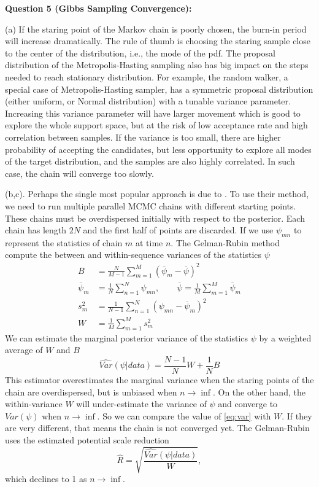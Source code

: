 \documentclass[12pt]{article}
\begin{document}
\newpage
\textbf{Question 5 (Gibbs Sampling Convergence):}

(a) If the staring point of the Markov chain is poorly chosen, the burn-in
period will increase dramatically. The rule of thumb is choosing the staring
sample close to the center of the distribution, i.e., the mode of the pdf. The
proposal distribution of the Metropolis-Hasting sampling also has big impact on
the steps needed to reach stationary distribution. For example, the random
walker, a special case of Metropolis-Hasting sampler, has a symmetric proposal
distribution (either uniform, or Normal distribution) with a tunable variance
parameter. Increasing this variance parameter will have larger movement which is
good to explore the whole support space, but at the risk of low acceptance rate
and high correlation between samples. If the variance is too small, there are
higher probability of accepting the candidates, but less opportunity to explore
all modes of the target distribution, and the samples are also highly
correlated. In such case, the chain will converge too slowly.

 (b,c). Perhaps the single most popular approach is due to
\citet{gelman1992inference}. To use their method, we need to run multiple
parallel MCMC chains with different starting points. These chains must be
overdispersed initially with respect to the posterior. Each chain has length
$2N$ and the first half of points are discarded. If we use $\psi_{mn}$ to
represent the statistics of chain $m$ at time $n$.  The Gelman-Rubin method
compute the between and within-sequence variances of the statistics $\psi$
\begin{align*}
  B &= \frac{N}{M-1}\sum_{m=1}^{M}(\overline\psi_{m} - \overline \psi)^2\\
  \overline\psi_m &= \frac{1}{N}\sum_{n=1}^N\psi_{mn}, \qquad \overline\psi = \frac{1}{M}\sum_{m=1}^M\overline\psi_m\\
  s_m^2 &= \frac{1}{N-1}\sum_{n=1}^N(\psi_{mn} - \overline\psi_m)^2\\
  W &= \frac{1}{M}\sum_{m=1}^M s_m^2
\end{align*}
We can estimate the marginal posterior variance of the statistics $\psi$ by a weighted average of $W$ and $B$
\begin{equation}
 \widehat {Var}(\psi|data) = \frac{N-1}{N}W + \frac{1}{N}B \label{eq:var}
\end{equation}
This estimator overestimates the marginal variance when the staring points of
the chain are overdispersed, but is unbiased when $n\rightarrow \inf$. On the
other hand, the within-variance $W$ will under-estimate the variance of $\psi$
and converge to $Var(\psi)$ when $n\rightarrow\inf$. So we can compare the value
of \eqref{eq:var} with $W$. If they are very different, that means the chain is
not converged yet. The Gelman-Rubin uses the estimated potential scale reduction
\begin{equation*}
  \widehat R = \sqrt{\frac{\widehat{Var}(\psi|data)}{W}},
\end{equation*}
which declines to 1 as $n\rightarrow\inf$.  
\end{document}
